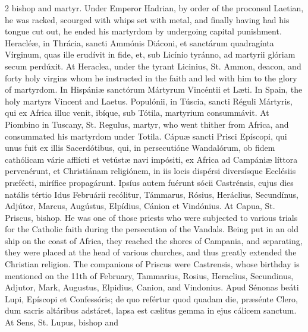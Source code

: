 \begin{paracol}{2}
 bishop and martyr. Under Emperor Hadrian, by order of the proconsul 
 Laetian, he was racked, scourged with whips set with metal, and finally 
 having had his tongue cut out, he ended his martyrdom by undergoing capital 
 punishment.
\switchcolumn*
{}
Heracléæ, in Thrácia, 
 sancti Ammónis Diáconi, et sanctárum quadragínta Vírginum, quas ille 
 erudívit in fide, et, sub Licínio tyránno, ad martyrii glóriam secum 
 perdúxit.
\switchcolumn
{}
At Heraclea, under the tyrant 
 Licinius, St. Ammon, deacon, and forty holy virgins whom he instructed in 
 the faith and led with him to the glory of martyrdom.
\switchcolumn*
{}
In Hispániæ sanctórum 
 Mártyrum Vincéntii et Læti.
\switchcolumn
{}
In Spain, the holy martyrs Vincent 
 and Laetus.
\switchcolumn*
{}
Populónii, in Túscia, 
 sancti Réguli Mártyris, qui ex Africa illuc venit, ibíque, sub Tótila, 
 martyrium consummávit.
\switchcolumn
{}
At Piombino in Tuscany, St. Regulus, 
 martyr, who went thither from Africa, and consummated his martyrdom under 
 Totila.
\switchcolumn*
{}
Cápuæ sancti Prisci 
 Epíscopi, qui unus fuit ex illis Sacerdótibus, qui, in persecutióne 
 Wandalórum, ob fidem cathólicam várie afflícti et vetústæ navi impósiti, ex 
 Africa ad Campániæ líttora pervenérunt, et Christiánam religiónem, in iis 
 locis dispérsi diversísque Ecclésiis præfécti, mirífice propagárunt. 
 Ipsíus autem fuérunt sócii Castrénsis, cujus dies natális tértio Idus 
 Februárii recólitur, Támmarus, Rósius, Heráclius, Secundínus, Adjútor, 
 Marcus, Augústus, Elpídius, Cánion et Vindónius.
\switchcolumn
{}
At Capua, St. Priscus, bishop. 
 He was one of those priests who were subjected to various trials for the 
 Catholic faith during the persecution of the Vandals. Being put in an 
 old ship on the coast of Africa, they reached the shores of Campania, and 
 separating, they were placed at the head of various churches, and thus 
 greatly extended the Christian religion. The companions of Priscus 
 were Castrensis, whose birthday is mentioned on the 11th of February, 
 Tammarius, Rosius, Heraclius, Secundinus, Adjutor, Mark, Augustus, Elpidius, 
 Canion, and Vindonius.
\switchcolumn*
{}
Apud Sénonas beáti Lupi, 
 Epíscopi et Confessóris; de quo refértur quod quadam die, præsénte Clero, 
 dum sacris altáribus adstáret, lapsa est cælitus gemma in ejus cálicem 
 sanctum.
\switchcolumn
{}
At Sens, St. Lupus, bishop and 

\end{paracol}

